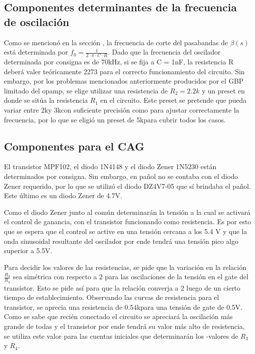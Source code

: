 \documentclass[../../tc_tp6_main.tex]{subfiles}
\begin{document}
\subsection{Componentes determinantes de la frecuencia de oscilación}

Como se mencionó en la sección , la frecuencia de corte del pasabandas de $\beta (s)$ está determinada por $f_0 = \frac{1}{2\cdot \pi \cdot C \cdot R}$. Dado que la frecuencia del oscilador determinada por consigna es de 70kHz, si se fija a C = 1nF, la resistencia R deberá valer teóricamente 2273 \ohm para el correcto funcionamiento del circuito. Sin embargo, por los problemas mencionados anteriormente producidos por el GBP limitado del opamp, se elige utilizar una resistencia de $R_2 = 2.2k$ y un preset en donde se sitúa la resistencia $R_1$ en el circuito. Este preset se pretende que pueda variar entre 2k\ohm y 3k\ohm  con suficiente precisión como para ajustar correctamente la frecuencia, por lo que se eligió un preset de 5k\ohm para cubrir todos los casos. 

\subsection{Componentes para el CAG}

El transistor MPF102, el diodo 1N4148 y el diodo Zener 1N5230 están determinados por consigna. Sin embargo, en pañol no se contaba con el diodo Zener requerido, por lo que se utilizó el diodo DZ4V7-05 que sí brindaba el pañol. Este último es un diodo Zener de 4.7V. \par

Como el diodo Zener junto al común determinarán la tensión a la cual se activará el control de ganancia, con el transistor funcionando como resistencia. Es por esto que se espera que el control se active en una tensión cercana a los 5.4 V y que la onda sinusoidal resultante del oscilador por ende tendrá una tensión pico algo superior a 5.5V.\par

Para decidir los valores de las resistencias, se pide que la variación en la relación $\frac{R_3}{R_4}$ sea simétrica con respecto a 2 para las oscilaciones de la tensión en el gate del transistor. Esto se pide así para que la relación converja a 2 luego de un cierto tiempo de establecimiento. Observando las curvas de resistencia para el transistor, se aprecia una resistencia de 0.54k\ohm para una tensión de gate de 0.5V. Como se sabe que recién conectado el circuito se apreciará la oscilación más grande de todas y el transistor por ende tendrá su valor más alto de resistencia, se utiliza este valor para las cuentas iniciales que determinarán los -valores de $R_3$ y $R_4$.\par
\end{document}
